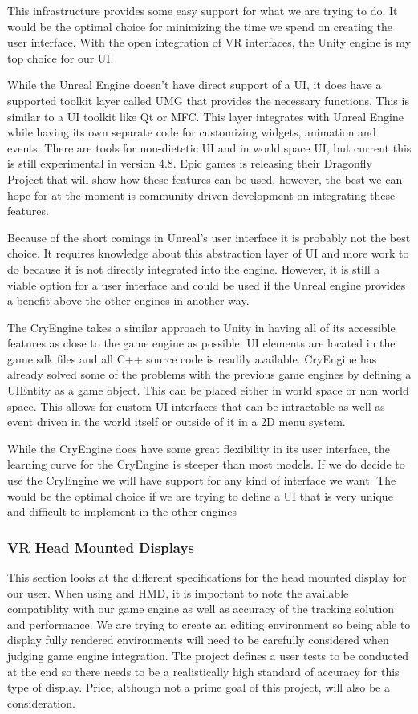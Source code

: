 \documentclass[onecolumn, draftclsnofoot,10pt, compsoc]{IEEEtran}
\newcounter{threesection}[subsubsection]
\begin{document}
This infrastructure provides some easy support for what we are trying to do. It would be the optimal choice for minimizing the time we spend on creating the user interface. With the open integration of VR interfaces, the Unity engine is my top choice for our UI. 

While the Unreal Engine doesn't have direct support of a UI, it does have a supported toolkit layer called UMG that provides the necessary functions. This is similar to a UI toolkit like Qt or MFC. This layer integrates with Unreal Engine while having its own separate code for customizing widgets, animation and events. There are tools for non-dietetic UI and in world space UI, but current this is still experimental in version 4.8. Epic games is releasing their Dragonfly Project that will show how these features can be used, however, the best we can hope for at the moment is community driven development on integrating these features.

Because of the short comings in Unreal's user interface it is probably not the best choice. It requires knowledge about this abstraction layer of UI and more work to do because it is not directly integrated into the engine. However, it is still a viable option for a user interface and could be used if the Unreal engine provides a benefit above the other engines in another way.

The CryEngine takes a similar approach to Unity in having all of its accessible features as close to the game engine as possible. UI elements are located in the game sdk files and all C++ source code is readily available. CryEngine has already solved some of the problems with the previous game engines by defining a UIEntity as a game object. This can be placed either in world space or non world space. This allows for custom UI interfaces that can be intractable as well as event driven in the world itself or outside of it in a 2D menu system.

While the CryEngine does have some great flexibility in its user interface, the learning curve for the CryEngine is steeper than most models. If we do decide to use the CryEngine we will have support for any kind of interface we want. The would be the optimal choice if we are trying to define a UI that is very unique and difficult to implement in the other engines

\subsubsection{VR Head Mounted Displays}
This section looks at the different specifications for the head mounted display for our user. When using and HMD, it is important to note the available compatiblity with our game engine as well as accuracy of the tracking solution and performance. We are trying to create an editing environment so being able to display fully rendered environments will need to be carefully considered when judging game engine integration. The project defines a user tests to be conducted at the end so there needs to be a realistically high standard of accuracy for this type of display. Price, although not a prime goal of this project, will also be a consideration.
\end{document}
